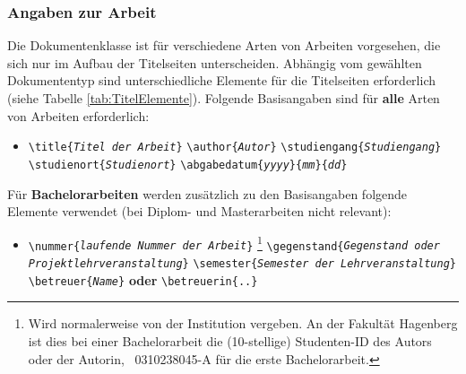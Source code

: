 \subsubsection{Angaben zur Arbeit}

Die Dokumentenklasse ist für verschiedene Arten von Arbeiten vorgesehen, die sich nur im Aufbau 
der Titelseiten unterscheiden. 
Abhängig vom gewählten Dokumententyp sind unterschiedliche Elemente für die Titelseiten erforderlich (siehe Tabelle \ref{tab:TitelElemente}).
Folgende Basisangaben sind für \textbf{alle} Arten von Arbeiten
erforderlich:
%
\begin{itemize}
\item[] %
\verb!\title{!\texttt{\em Titel der Arbeit}\verb!}! \newline%
\verb!\author{!\texttt{\em Autor}\verb!}! \newline%
\verb!\studiengang{!\texttt{\em Studiengang}\verb!}! \newline%
\verb!\studienort{!\texttt{\em Studienort}\verb!}! \newline%
\verb!\abgabedatum{!\texttt{\em yyyy}\verb!}{!\texttt{\em mm}\verb!}{!\texttt{\em dd}\verb!}!
\end{itemize}
%
\noindent Für \textbf{Bachelorarbeiten} werden zusätzlich zu den Basisangaben folgende Elemente verwendet (bei Diplom- und Masterarbeiten nicht relevant):
%
\begin{itemize}
\item[] \verb!\nummer{!\texttt{\em laufende Nummer der Arbeit}\verb!}!%
\footnote{Wird normalerweise von der Institution vergeben. An der
Fakultät Hagenberg ist dies bei einer Bachelorarbeit die (10-stellige) Studenten-ID 
des Autors oder der Autorin,
\zB\ \textsf{0310238045-A} für die erste Bachelorarbeit.} \newline%
\verb!\gegenstand{!\texttt{\em Gegenstand oder Projektlehrveranstaltung}\verb!}! \newline%
\verb!\semester{!\texttt{\em Semester der Lehrveranstaltung}\verb!}! \newline%
\verb!\betreuer{!\texttt{\em Name}\verb!}! \textbf{oder}
\verb!\betreuerin{..}!
\end{itemize}

